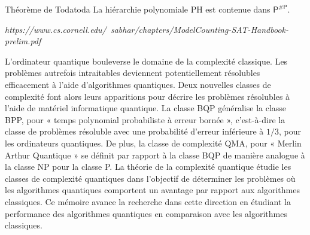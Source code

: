 \begin{subtheorem}{Théorème de Toda}{toda}
    La hiérarchie polynomiale \textsf{PH} est contenue dans $\textsf{P}^{\textsf{\#P}}$.
\end{subtheorem}

\textcolor{mydarkred}{\textit{https://www.cs.cornell.edu/~sabhar/chapters/ModelCounting-SAT-Handbook-prelim.pdf}}


L'ordinateur quantique bouleverse le domaine de la complexité classique. Les problèmes autrefois intraitables deviennent potentiellement résolubles efficacement à l'aide d'algorithmes quantiques. Deux nouvelles classes de complexité font alors leurs apparitions pour décrire les problèmes résolubles à l'aide de matériel informatique quantique. La classe \textsf{BQP} généralise la classe \textsf{BPP}, pour « temps polynomial probabiliste à erreur bornée », c'est-à-dire la classe de problèmes résoluble avec une probabilité d'erreur inférieure à $1/3$, pour les ordinateurs quantiques. De plus, la classe de complexité \textsf{QMA}, pour « Merlin Arthur Quantique » se définit par rapport à la classe \textsf{BQP} de manière analogue à la classe \textsf{NP} pour la classe \textsf{P}. La théorie de la complexité quantique étudie les classes de complexité quantiques dans l'objectif de déterminer les problèmes où les algorithmes quantiques comportent un avantage par rapport aux algorithmes classiques. Ce mémoire avance la recherche dans cette direction en étudiant la performance des algorithmes quantiques en comparaison avec les algorithmes classiques.




